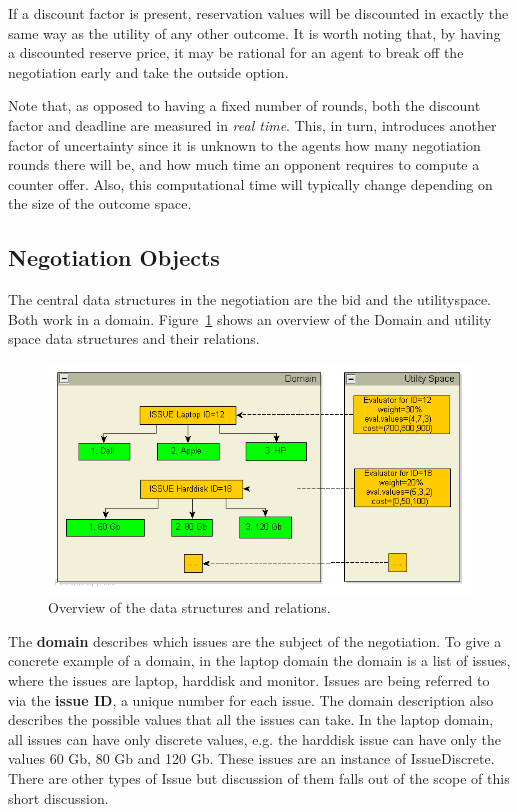 \documentclass[]{article}
\begin{document}
If a discount factor is present, reservation values will be discounted in exactly the same way as the utility of any other outcome. It is worth noting that, by having a discounted reserve price, it may be rational for an agent to break off the negotiation early and take the outside option.

Note that, as opposed to having a fixed number of rounds, both the discount factor and deadline are measured in {\it real time}. This, in turn, introduces another factor of uncertainty since it is unknown to the agents how many negotiation rounds there will be, and how much time an opponent requires to compute a counter offer. Also, this computational time will typically change depending on the size of the outcome space. 

\subsection{Negotiation Objects}
The central data structures in the negotiation are the bid and the utilityspace. Both work in a domain. Figure~\ref{Fig:data structure and relation overview} shows an overview of the Domain and utility space data structures and their relations.

\begin{figure}[htb]
	\centering
	\includegraphics{media/datastructures.png}
	\caption{Overview of the data structures and relations.}\label{Fig:data structure and relation overview}
\end{figure}

The {\bf domain} describes which issues are the subject of the negotiation. To give a concrete example of a domain, in the laptop domain the domain is a list of issues, where the issues are laptop, harddisk and monitor. Issues are being referred to via the {\bf issue ID},  a unique number for each issue. The domain description also describes the possible values that all the issues can take. In the laptop domain, all issues can have only discrete values, e.g. the harddisk issue can have only the values 60 Gb, 80 Gb and 120 Gb. These issues are an instance of IssueDiscrete. There are other types of Issue but discussion of them falls out of the scope of this short discussion.
\end{document}

